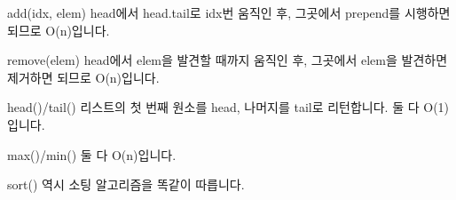 \documentclass{beamer}
\begin{document}
\begin{frame}{add(idx, elem)}
head에서 head.tail로 idx번 움직인 후, 그곳에서 prepend를 시행하면 되므로 O(n)입니다. 
\end{frame}

\begin{frame}{remove(elem)}
head에서 elem을 발견할 때까지 움직인 후, 그곳에서 elem을 발견하면 제거하면 되므로 O(n)입니다. 
\end{frame}

\begin{frame}{head()/tail()}
리스트의 첫 번째 원소를 head, 나머지를 tail로 리턴합니다. 둘 다 O(1)입니다. 
\end{frame}

\begin{frame}{max()/min()}
둘 다 O(n)입니다. 
\end{frame}

\begin{frame}{sort()}
역시 소팅 알고리즘을 똑같이 따릅니다. 
\end{frame}










\end{document}

